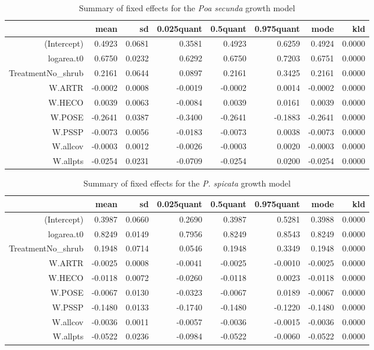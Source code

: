 \documentclass[11pt]{article}
\begin{document}
\begin{table}[ht]
\centering
\caption{Summary of fixed effects for the \textit{Poa secunda} growth model} 
\label{POSEgrowth}
\begin{tabular}{rrrrrrrr}
  \hline
 & mean & sd & 0.025quant & 0.5quant & 0.975quant & mode & kld \\ 
  \hline
(Intercept) & 0.4923 & 0.0681 & 0.3581 & 0.4923 & 0.6259 & 0.4924 & 0.0000 \\ 
  logarea.t0 & 0.6750 & 0.0232 & 0.6292 & 0.6750 & 0.7203 & 0.6751 & 0.0000 \\ 
  TreatmentNo\_shrub & 0.2161 & 0.0644 & 0.0897 & 0.2161 & 0.3425 & 0.2161 & 0.0000 \\ 
  W.ARTR & -0.0002 & 0.0008 & -0.0019 & -0.0002 & 0.0014 & -0.0002 & 0.0000 \\ 
  W.HECO & 0.0039 & 0.0063 & -0.0084 & 0.0039 & 0.0161 & 0.0039 & 0.0000 \\ 
  W.POSE & -0.2641 & 0.0387 & -0.3400 & -0.2641 & -0.1883 & -0.2641 & 0.0000 \\ 
  W.PSSP & -0.0073 & 0.0056 & -0.0183 & -0.0073 & 0.0038 & -0.0073 & 0.0000 \\ 
  W.allcov & -0.0003 & 0.0012 & -0.0026 & -0.0003 & 0.0020 & -0.0003 & 0.0000 \\ 
  W.allpts & -0.0254 & 0.0231 & -0.0709 & -0.0254 & 0.0200 & -0.0254 & 0.0000 \\ 
   \hline
\end{tabular}
\end{table}

\begin{table}[ht]
\centering
\caption{Summary of fixed effects for the \textit{P. spicata} growth model} 
\label{PSSPgrowth}
\begin{tabular}{rrrrrrrr}
  \hline
 & mean & sd & 0.025quant & 0.5quant & 0.975quant & mode & kld \\ 
  \hline
(Intercept) & 0.3987 & 0.0660 & 0.2690 & 0.3987 & 0.5281 & 0.3988 & 0.0000 \\ 
  logarea.t0 & 0.8249 & 0.0149 & 0.7956 & 0.8249 & 0.8543 & 0.8249 & 0.0000 \\ 
  TreatmentNo\_shrub & 0.1948 & 0.0714 & 0.0546 & 0.1948 & 0.3349 & 0.1948 & 0.0000 \\ 
  W.ARTR & -0.0025 & 0.0008 & -0.0041 & -0.0025 & -0.0010 & -0.0025 & 0.0000 \\ 
  W.HECO & -0.0118 & 0.0072 & -0.0260 & -0.0118 & 0.0023 & -0.0118 & 0.0000 \\ 
  W.POSE & -0.0067 & 0.0130 & -0.0323 & -0.0067 & 0.0189 & -0.0067 & 0.0000 \\ 
  W.PSSP & -0.1480 & 0.0133 & -0.1740 & -0.1480 & -0.1220 & -0.1480 & 0.0000 \\ 
  W.allcov & -0.0036 & 0.0011 & -0.0057 & -0.0036 & -0.0015 & -0.0036 & 0.0000 \\ 
  W.allpts & -0.0522 & 0.0236 & -0.0984 & -0.0522 & -0.0060 & -0.0522 & 0.0000 \\ 
   \hline
\end{tabular}
\end{table}
\end{document}
